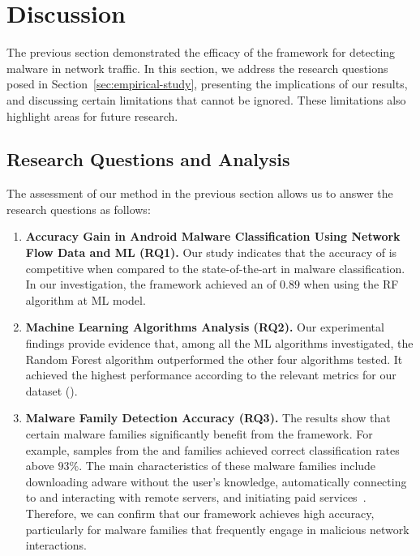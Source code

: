 \section{Discussion}\label{sec:discussion}

The previous section demonstrated the efficacy of the \droidxpflow framework for detecting malware in network traffic. In this section, we address the research questions posed in Section~\ref{sec:empirical-study}, presenting the implications of our results, and discussing certain limitations that cannot be ignored. These limitations also highlight areas for future research.

\subsection{Research Questions and Analysis}\label{sec:questions}

The assessment of our method in the previous section allows us to answer the research questions as follows:\newline



\begin{enumerate}
    \item \textbf{Accuracy Gain in Android Malware Classification Using Network Flow Data and ML (RQ1).} Our study indicates that the accuracy of \droidxpflow is competitive when compared to the state-of-the-art in malware classification. In our investigation, the framework achieved an \fone of $0.89$ when using the RF algorithm at ML model.
    
    \item \textbf{Machine Learning Algorithms Analysis (RQ2).} Our experimental findings provide evidence that, among all the ML algorithms investigated, the Random Forest algorithm outperformed the other four algorithms tested. It achieved the highest performance according to the relevant metrics for our dataset (\fds).
    
    \item \textbf{Malware Family Detection Accuracy (RQ3).} The results show that certain malware families significantly benefit from the \droidxpflow framework. For example, samples from the \tjk and \gps families achieved correct classification rates above $93\%$. The main characteristics of these malware families include downloading adware without the user’s knowledge, automatically connecting to and interacting with remote servers, and initiating paid services~\cite{DBLP:journals/jnca/WangCYYPJ19}. Therefore, we can confirm that our framework achieves high accuracy, particularly for malware families that frequently engage in malicious network interactions.
\end{enumerate}

